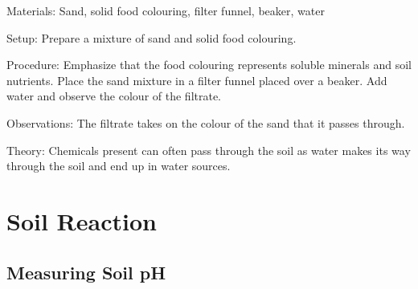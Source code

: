 \begin{multicols}{2}

\begin{description*}
\item[Materials:]{Sand, solid food colouring, filter funnel, beaker, water}
\item[Setup:]{Prepare a mixture of sand and solid food colouring.}
\item[Procedure:]{Emphasize that the food colouring represents soluble minerals and soil nutrients. Place the sand mixture in a filter funnel placed over a beaker. Add water and observe the colour of the filtrate.}
\item[Observations:]{The filtrate takes on the colour of the sand that it passes through.}
\item[Theory:]{Chemicals present can often pass through the soil as water makes its way through the soil and end up in water sources.}
\end{description*}





\section*{Soil Reaction}

\subsection{Measuring Soil pH}



\end{multicols}
